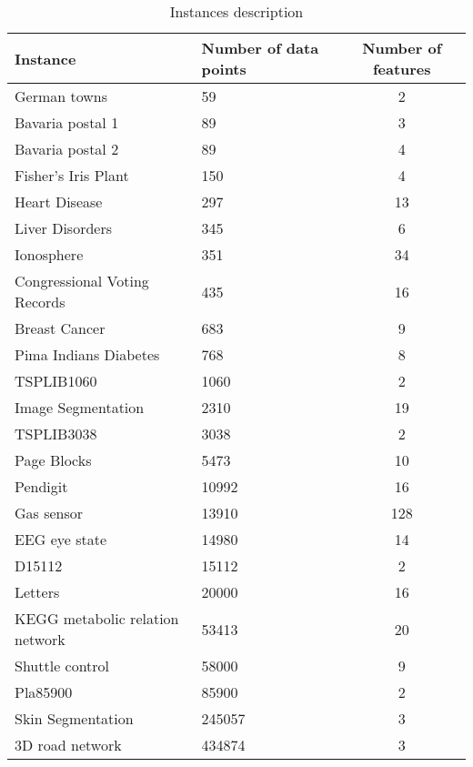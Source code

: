 \begin{table}[]
\centering
\begin{tabular}{@{}llc@{}}
\toprule
Instance                        & Number of data points & Number of features \\ \midrule
German towns                    & 59                    & 2                  \\
Bavaria postal 1                & 89                    & 3                  \\
Bavaria postal 2                & 89                    & 4                  \\
Fisher’s Iris Plant             & 150                   & 4                  \\
Heart Disease                   & 297                   & 13                 \\
Liver Disorders                 & 345                   & 6                  \\
Ionosphere                      & 351                   & 34                 \\
Congressional Voting Records    & 435                   & 16                 \\
Breast Cancer                   & 683                   & 9                  \\
Pima Indians Diabetes           & 768                   & 8                  \\
TSPLIB1060                      & 1060                  & 2                  \\
Image Segmentation              & 2310                  & 19                 \\
TSPLIB3038                      & 3038                  & 2                  \\
Page Blocks                     & 5473                  & 10                 \\
Pendigit                        & 10992                 & 16                 \\
Gas sensor                      & 13910                 & 128                \\
EEG eye state                   & 14980                 & 14                 \\
D15112                          & 15112                 & 2                  \\
Letters                         & 20000                 & 16                 \\
KEGG metabolic relation network & 53413                 & 20                 \\
Shuttle control                 & 58000                 & 9                  \\
Pla85900                        & 85900                 & 2                  \\
Skin Segmentation               & 245057                & 3                  \\
3D road network                 & 434874                & 3                  \\ \bottomrule
\end{tabular}
\caption{Instances description}
\label{instances}
\end{table}